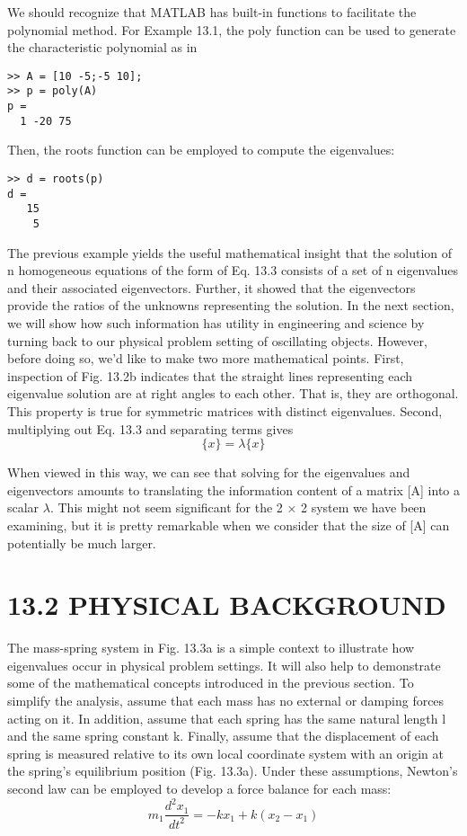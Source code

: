 \documentclass[../main.tex]{subfiles}
\begin{document}
We should recognize that MATLAB has built-in functions to facilitate the polynomial
method. For Example 13.1, the poly function can be used to generate the characteristic
polynomial as in

\begin{lstlisting}[numbers=none]
>> A = [10 -5;-5 10];
>> p = poly(A)
p =
  1 -20 75
\end{lstlisting}

Then, the roots function can be employed to compute the eigenvalues:
\begin{lstlisting}[numbers=none]
>> d = roots(p)
d =
   15
    5
\end{lstlisting}


The previous example yields the useful mathematical insight that the solution of n
homogeneous equations of the form of Eq. 13.3 consists of a set of n eigenvalues and their
associated eigenvectors. Further, it showed that the eigenvectors provide the ratios of the
unknowns representing the solution. In the next section, we will show how such information has utility in engineering and
science by turning back to our physical problem setting of oscillating objects. However,
before doing so, we'd like to make two more mathematical points.
First, inspection of Fig. 13.2b indicates that the straight lines representing each eigenvalue solution are at right angles to each other. That is, they are orthogonal. This property
is true for symmetric matrices with distinct eigenvalues.
Second, multiplying out Eq. 13.3 and separating terms gives
\begin{equation}
[A]\{x\}=\lambda\{x\}
\end{equation}

When viewed in this way, we can see that solving for the eigenvalues and eigenvectors
amounts to translating the information content of a matrix [A] into a scalar $\lambda$. This might
not seem significant for the 2 × 2 system we have been examining, but it is pretty remarkable when we consider that the size of [A] can potentially be much larger.


\section*{13.2 PHYSICAL BACKGROUND}
The mass-spring system in Fig. 13.3a is a simple context to illustrate how eigenvalues occur
in physical problem settings. It will also help to demonstrate some of the mathematical
concepts introduced in the previous section.
To simplify the analysis, assume that each mass has no external or damping forces
acting on it. In addition, assume that each spring has the same natural length l and the same
spring constant k. Finally, assume that the displacement of each spring is measured relative
to its own local coordinate system with an origin at the spring's equilibrium position
(Fig. 13.3a). Under these assumptions, Newton's second law can be employed to develop
a force balance for each mass:
\begin{equation}
m_{1}\frac{d^{2}x_{1}}{dt^{2}}=-kx_{1}+k(x_{2}-x_{1})\tag{13.8a}
\end{equation}
\end{document}
